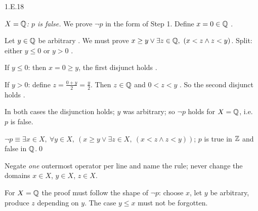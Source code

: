 \begin{bookex}[essential]{1.E.18}
\begin{steps}
\item \emph{$X=\mathbb{Q}$: $p$ is false.} We prove $\neg p$ in the form of Step 1. Define $x=0\in\mathbb{Q}$ .
\item Let $y\in\mathbb{Q}$ be arbitrary . We must prove $x\ge y\vee\exists z\in\Q,\ (x<z\wedge z<y)$. Split: either $y\le0$ or $y>0$ .
\item If $y\le0$: then $x=0\ge y$, the first disjunct holds .
\item If $y>0$: define $z=\frac{0+y}2=\frac y2$. Then $z\in\mathbb{Q}$  and $0<z<y$ . So the second disjunct holds .
\item In both cases the disjunction holds; $y$ was arbitrary; so $\neg p$ holds for $X=\mathbb{Q}$, i.e.\ $p$ is false.
\end{steps}
\conclusion $\neg p\equiv\exists x\in X,\ \forall y\in X,\ (x\ge y\vee\exists z\in X,\ (x<z\wedge z<y))$; $p$ is true in $\mathbb{Z}$ and false in $\mathbb{Q}$.\qed
\begin{compare}
\item Negate \emph{one} outermost operator per line and name the rule; never change the domains $x\in X$, $y\in X$, $z\in X$.
\item For $X=\mathbb{Q}$ the proof must follow the shape of $\neg p$: choose $x$, let $y$ be arbitrary, produce $z$ depending on $y$. The case $y\le x$ must not be forgotten.
\end{compare}
\end{bookex}

